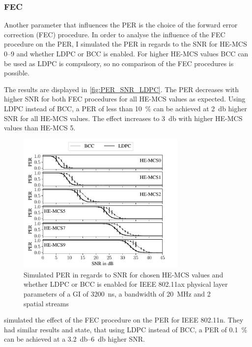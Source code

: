 \subsubsection*{\acf{FEC}}
Another parameter that influences the \ac{PER} is the choice of the forward error correction (FEC) procedure. In order to
analyse the influence of the FEC procedure on the \ac{PER}, I simulated the \ac{PER} in regards to the \ac{SNR} for HE-MCS
\numrange{0}{9} and whether \ac{LDPC} or \ac{BCC} is enabled. For higher HE-MCS values \ac{BCC} can be used as \ac{LDPC} is compulsory, so no comparison of the \ac{FEC} procedures is possible.

The results are displayed in \autoref{fig:PER_SNR_LDPC}. The \ac{PER} decreases with higher \ac{SNR} for both \ac{FEC} procedures for all HE-MCS values as
expected. Using \ac{LDPC} instead of \ac{BCC}, a \ac{PER} of less than \SI{10}{\percent} can be achieved at \SI{2}{\decibel} higher \ac{SNR}
for all HE-MCS values. The effect increases to \SI{3}{\decibel} with higher HE-MCS values than HE-MCS \num{5}.
\begin{figure}[H]%
	\centering
	\includegraphics[width=0.74\textwidth]{figures/LDPC_PER_to_SNR.pdf}
	\caption{Simulated \ac{PER} in regards to \ac{SNR} for chosen HE-\ac{MCS} values and whether \ac{LDPC} or \ac{BCC} is enabled for IEEE 802.11ax physical layer parameters of a \ac{GI} of \SI{3200}{\nano\second}, a bandwidth of \SI{20}{\mega\hertz} and 2 spatial streams}%
	\label{fig:PER_SNR_LDPC}%
\end{figure}

\textcite{syafei_performance_2009} simulated the effect of the \ac{FEC} procedure on the \ac{PER} for IEEE 802.11n. They
had similar results and state, that using \ac{LDPC} instead of \ac{BCC}, a \ac{PER} of \SI{0.1}{\percent}  can be achieved at a
\SIrange{3.2}{6}{\decibel} higher \ac{SNR}.

